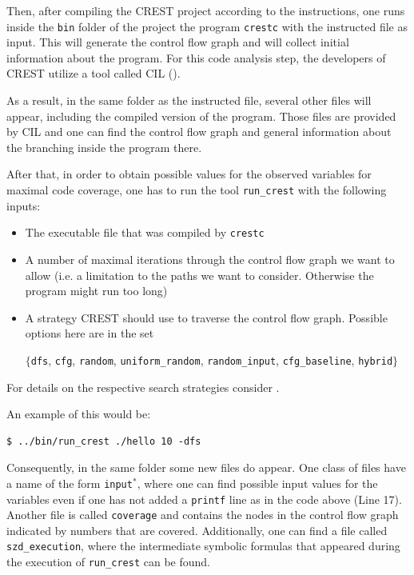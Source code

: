 \documentclass[oribibl]{llncs}
\begin{document}
Then, after compiling the \textsc{CREST} project according to the
instructions, one runs inside the \texttt{bin} folder of the project
the program \texttt{crestc} with the instructed file as input. This
will generate the control flow graph and will collect initial information
about the program. For this code analysis step, the developers of
\textsc{CREST} utilize a tool called \textsc{CIL} (\cite{necula2002cil}).

As a result, in the same folder as the instructed file, several other
files will appear, including the compiled version of the
program. Those files are provided by \textsc{CIL} and one can find the
control flow graph and general information about the branching inside
the program there. %

After that, in order to obtain possible values for the observed
variables for maximal code coverage, one has to run the tool
\texttt{run\_crest} with the following inputs:
\begin{itemize}
  \item The executable file that was compiled by \texttt{crestc}
  \item A number of maximal iterations through the control flow graph
    we want to allow (i.e. a limitation to the paths we
    want to consider. Otherwise the program might run too long)
  \item A strategy \textsc{CREST} should use to traverse the control
    flow graph. Possible options here are in the set
\begin{center}
$\{$\texttt{dfs}, \texttt{cfg}, \texttt{random},
    \texttt{uniform\_random}, \texttt{random\_input}, 
    \texttt{cfg\_baseline}, \texttt{hybrid}$\}$
\end{center}
\end{itemize}
For details on the respective search strategies consider
\cite{CREST}.

An example of this would be:
\begin{verbatim}
$ ../bin/run_crest ./hello 10 -dfs
\end{verbatim}

Consequently, in the same folder some new files do appear. One class of
files have a name of the form \texttt{input}${}^*$, where one can find possible input
values for the variables even if one has not added a \texttt{printf} line as in the
code above (Line 17). Another file is called \texttt{coverage} and contains the
nodes in the control flow graph indicated by numbers that are
covered. Additionally, one can find a file called
\texttt{szd\_execution}, where the intermediate symbolic formulas that
appeared during the execution of \texttt{run\_crest} can be found.
\end{document}
